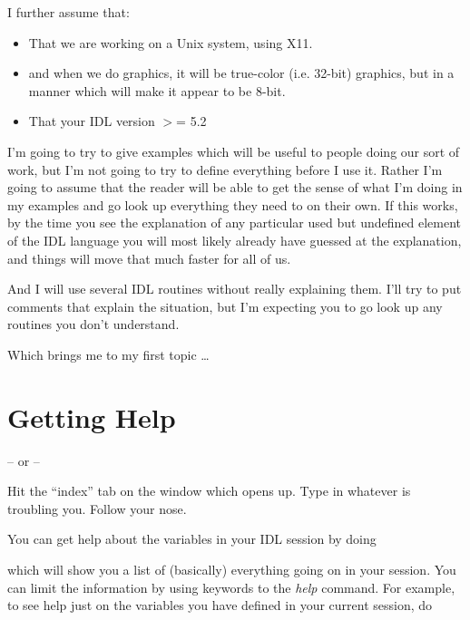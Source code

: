    I further assume that:

   \begin{itemize}

     \item That we are working on a Unix system, using X11.

     \item and when we do graphics, it will be true-color
       (i.e. 32-bit) graphics, but in a manner which will make it
       appear to be 8-bit.

     \item That your IDL version $>$= 5.2
   \end{itemize}


   I'm going to try to give examples which will be useful to people
  doing our sort of work, but I'm not going to try to define
  everything before I use it. Rather I'm going to assume that the
  reader will be able to get the sense of what I'm doing in my
  examples and go look up everything they need to on their own. If
  this works, by the time you see the explanation of any particular
  used but undefined element of the IDL language you will most likely
  already have guessed at the explanation, and things will move that
  much faster for all of us.

  And I will use several IDL routines without really explaining
  them. I'll try to put comments that explain the situation, but I'm
  expecting you to go look up any routines you don't understand.

  Which brings me to my first topic \ldots


\newpage
\section{Getting Help}\label{sec:Getting-Help}


   -- or --


   Hit the ``index'' tab on the window which opens up. Type in
   whatever is troubling you. Follow your nose.

   You can get help about the variables in your IDL session by doing 


  which will show you a list of (basically) everything going on in your
  session. You can limit the information by using keywords to the
  \textit{help} command. For example, to see help just on the variables
  you have defined in your current session, do 

